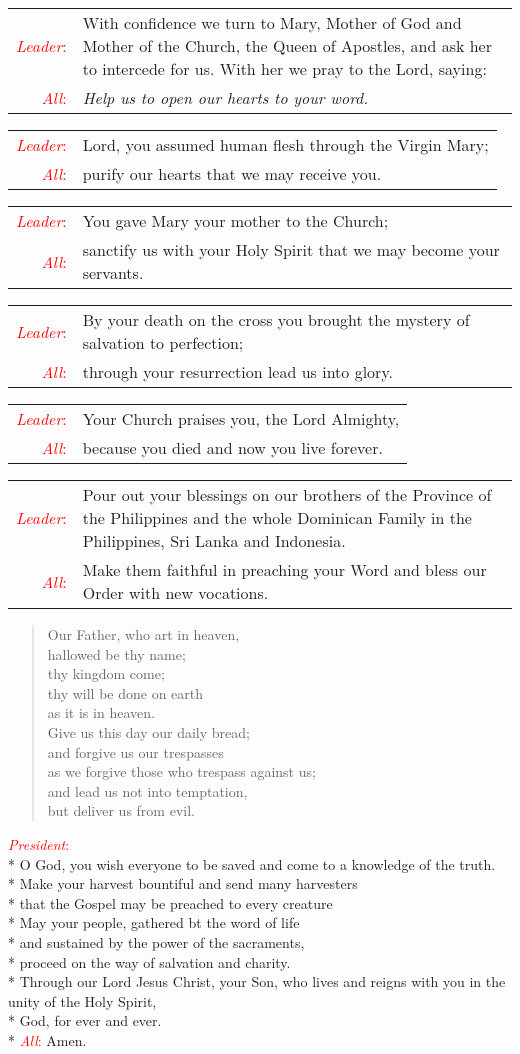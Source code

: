 \documentclass[letterpaper,14pt]{extarticle}
\newcommand{\side}[1]{\flagverse{\textcolor{red}{\textit{#1}}:}}
\newcommand{\sidestar}[1]{\textcolor{red}{\textit{#1}:}}
\newlength{\oldindent}
\newcommand{\antiphon}[2]{
	\setlength{\oldindent}{\vindent}
	\setlength{\vindent}{0em}
	\begin{verse}
	\side{#1} \textbf{#2}
	\end{verse}
	\setlength{\vindent}{\oldindent}
}
\newcommand{\intercession}[2]{
	\begin{tabular}[h]{r p{4.25in}}
		\sidestar{Leader} & #1 \\
		\sidestar{All} & #2
	\end{tabular}}
\begin{document}
\intercession{With confidence we turn to Mary, Mother of God and Mother of the Church, the Queen of Apostles, and ask her to intercede for us. With her we pray to the Lord, saying:}
{\textit{Help us to open our hearts to your word.}}

\intercession{Lord, you assumed human flesh through the Virgin Mary;}
{purify our hearts that we may receive you.}

\intercession{You gave Mary your mother to the Church;}
{sanctify us with your Holy Spirit that we may become your servants.}

\intercession{By your death on the cross you brought the mystery of salvation to perfection;}
{through your resurrection lead us into glory.}

\intercession{Your Church praises you, the Lord Almighty,}
{because you died and now you live forever.}

\intercession{Pour out your blessings on our brothers of the Province of the Philippines and
the whole Dominican Family in the Philippines, Sri Lanka and Indonesia.}{Make
them faithful in preaching your Word and bless our Order with new vocations.}

	
\begin{verse}
	\side{All} Our Father, who art in heaven,\\ %
hallowed be thy name; \\
thy kingdom come; \\
thy will be done on earth \\
as it is in heaven. \\
Give us this day our daily bread; \\
and forgive us our trespasses \\
as we forgive those who trespass against us; \\
and lead us not into temptation, \\
but deliver us from evil.
\end{verse}


\sidestar{President}\\*
O God, you wish everyone to be saved and come to a knowledge of the truth. \\*
Make your harvest bountiful and send many harvesters \\*
that the Gospel may be preached to every creature \\*
May your people, gathered bt the word of life \\*
and sustained by the power of the sacraments, \\*
proceed on the way of salvation and charity. \\*
Through our Lord Jesus Christ, your Son,
who lives and reigns with you in the unity of the Holy Spirit,\\*
God, for ever and ever.\\*
\sidestar{All} Amen.
\end{document}
